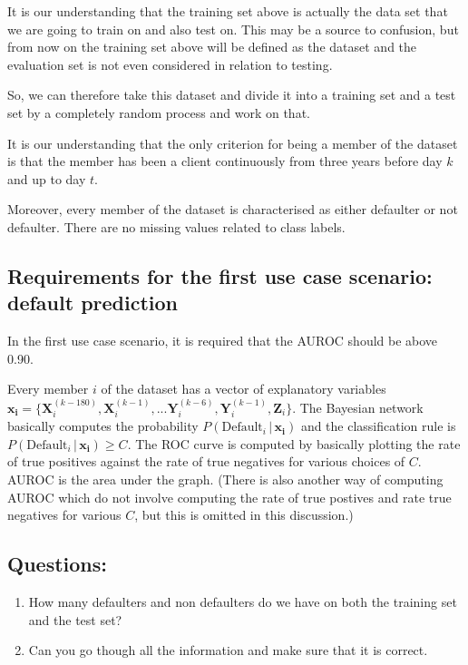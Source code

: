\documentclass{article}
\theoremstyle{theorem}
\theoremstyle{definition}
\newcommand{\bv}[1]{\bm{#1}}
\newcommand{\X}{\mathbf{X}}
\newcommand{\Y}{\mathbf{Y}}
\newcommand{\Z}{\mathbf{Z}}
\begin{document}
It is our understanding that the training set above is actually the data set that we are going to train on and also test on. This may be a source to confusion, but from now on the training set above will be defined as the dataset and the evaluation set is not even considered in relation to testing. 

So, we can therefore take this dataset and divide it into a training set and a test set by a completely random process and work on that.  

It is our understanding that the only criterion for being a member of the dataset is that the member has been a client continuously from three years before day $k$ and up to day $t$.  

Moreover, every member of the dataset is characterised as either defaulter or not defaulter.  There are no missing values related to class labels.

\subsection*{Requirements for the first use case scenario: default prediction}

In the first use case scenario, it is required that the AUROC should be above 0.90.
 
Every member $i$ of the dataset has a vector of explanatory variables\\
$\bv{x_i} =\{ \X_i^{(k-180)},  \X_i^{(k-1)}, ...\Y_i^{(k-6)}, \Y_i^{(k-1)},\Z_i\}$.  The Bayesian network basically computes the probability $P(\mbox{Default}_i \,|\, \bv{x_i})$ and the classification rule is
$P(\mbox{Default}_i \,|\, \bv{x_i}) \geq C$.  The ROC curve is computed by basically plotting the rate of true positives against the rate of true negatives for various choices of $C$.  AUROC is the area under the graph.  (There is also another way of computing AUROC which do not involve computing the rate of true postives and rate true negatives for various $C$, but this is omitted in this discussion.)

\subsection*{Questions: }
\begin{enumerate}
\item How many defaulters and non defaulters do we have on both the training set and the test set?
\item Can you go though all the information and make sure that it is correct.
\end{enumerate}
\end{document}
